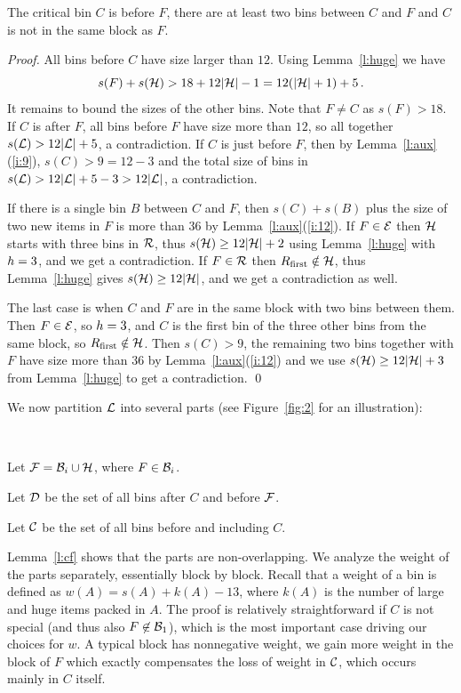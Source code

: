 \begin{lem}
\label{l:cf} 
The critical bin $C$ is before $F$, there are at least two bins
between $C$ and $F$ and $C$ is not in the same block as $F$.
\end{lem}
\begin{proof}
All bins before $C$ have size larger than $12$. Using
Lemma~\ref{l:huge} we have
$$s(F)+s({\mathcal H})>18+12|{\mathcal H}|-1=12(|{\mathcal H}|+1)+5\,.$$ 
It remains to bound the sizes of the other bins. Note that $F\neq C$ as $s(F)>18$.
If $C$ is after $F$,
all bins before $F$ have size more than $12$, so all together
$s({\mathcal L})>12|{\mathcal L}|+5$, a contradiction. If $C$ is just before $F$,
then by Lemma~\ref{l:aux}(\ref{i:9}),
$s(C)>9=12-3$ and the total size of bins in $s({\mathcal L})>
12|{\mathcal L}|+5-3>12|{\mathcal L}|$, a contradiction.

If there is a single bin $B$ between $C$ and $F$, then $s(C)+s(B)$
plus the size of two new items in $F$ is more than $36$ by
Lemma~\ref{l:aux}(\ref{i:12}). If $F\in{\mathcal E}$ then ${\mathcal H}$ starts with
three bins in ${\mathcal R}$, thus $s({\mathcal H})\geq12|{\mathcal H}|+2$ using 
Lemma~\ref{l:huge} with ${h}=3$, and we get a
contradiction. If $F\in{\mathcal R}$ then $R_{\mbox{\rm\scriptsize first}}\notin{\mathcal H}$, thus
Lemma~\ref{l:huge} gives $s({\mathcal H})\geq12|{\mathcal H}|$, and we get a
contradiction as well.

The last case is when $C$ and $F$ are in the same block with two bins
between them. Then $F\in{\mathcal E}$, so ${h}=3$, and $C$ is the first
bin of the three other 
bins from the same block, so $R_{\mbox{\rm\scriptsize first}}\notin{\mathcal H}$. Then $s(C)>9$, the
remaining two bins together with $F$ have size more than $36$ by
Lemma~\ref{l:aux}(\ref{i:12}) and we use $s({\mathcal H})\ge 12|{\mathcal H}|+3$ from
Lemma~\ref{l:huge} to get a contradiction.
\qed
\end{proof}
We now partition ${\mathcal L}$ into several parts (see Figure~\ref{fig:2} for an illustration):

\begin{dfn}~
\begin{compactitem}
\item Let ${\mathcal F}={\mathcal B}_i\cup{\mathcal H}$, where $F\in{\mathcal B}_i$.
\item Let ${\mathcal D}$ be the set of all bins after $C$ and before ${\mathcal F}$.
\item Let ${\mathcal C}$ be the set of all bins before and including $C$.
\end{compactitem}
\end{dfn}

Lemma~\ref{l:cf} shows that the
parts are non-overlapping. We analyze the weight of the parts
separately, essentially block by block.
Recall that a weight of a bin is defined as $w(A)=s(A)+k(A)-13$,
where $k(A)$ is the number of large and huge items packed in $A$.
The proof is relatively
straightforward if $C$ is not special (and thus also
$F\not\in{\mathcal B}_1$), 
which is the most important case driving our choices for $w$. 
A typical block has nonnegative weight, we gain more
weight in the block of $F$ which exactly compensates the loss of
weight in ${\mathcal C}$, which occurs mainly in $C$ itself. 

